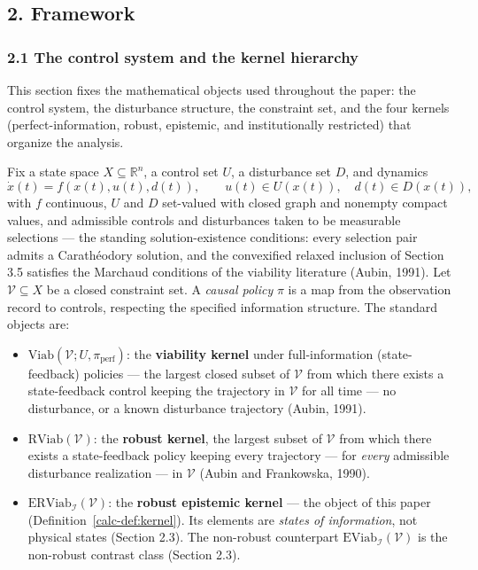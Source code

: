\documentclass[10pt,twocolumn]{article}
\theoremstyle{definition}
\providecommand{\tightlist}{\setlength{\itemsep}{0pt}\setlength{\parskip}{0pt}}
\begin{document}
\subsection{2. Framework}\label{calc-framework}

\subsubsection{2.1 The control system and the kernel
hierarchy}\label{calc-the-control-system-and-the-kernel-hierarchy}

This section fixes the mathematical objects used throughout the paper:
the control system, the disturbance structure, the constraint set, and
the four kernels (perfect-information, robust, epistemic, and
institutionally restricted) that organize the analysis.

Fix a state space \(X \subseteq \mathbb{R}^n\), a control set \(U\), a
disturbance set \(D\), and dynamics
\[\dot x(t) = f(x(t), u(t), d(t)), \qquad u(t) \in U(x(t)), \quad d(t) \in D(x(t)),\]
with \(f\) continuous, \(U\) and \(D\) set-valued with closed graph and
nonempty compact values, and admissible controls and disturbances taken
to be measurable selections --- the standing solution-existence conditions:
every selection pair admits a Carath\'eodory solution, and the
convexified relaxed inclusion of Section 3.5 satisfies the Marchaud
conditions of the viability literature (Aubin, 1991). Let \(\mathcal{V} \subseteq X\) be a closed
constraint set. A \emph{causal policy} \(\pi\) is a map from the
observation record to controls, respecting the specified information structure. The standard objects are:

\begin{itemize}
\tightlist
\item
  \(\mathrm{Viab}(\mathcal{V}; U, \pi_{\mathrm{perf}})\): the
  \textbf{viability kernel} under full-information (state-feedback)
  policies --- the largest closed subset of \(\mathcal{V}\) from which
  there exists a state-feedback control keeping the trajectory in
  \(\mathcal{V}\) for all time --- no disturbance, or a known
  disturbance trajectory (Aubin, 1991).
\item
  \(\mathrm{RViab}(\mathcal{V})\): the \textbf{robust kernel}, the
  largest subset of \(\mathcal{V}\) from which there exists a
  state-feedback policy keeping every trajectory --- for \emph{every}
  admissible disturbance realization --- in \(\mathcal{V}\) (Aubin and
  Frankowska, 1990).
\item
  \(\mathrm{ERViab}_{\mathcal{I}}(\mathcal{V})\): the \textbf{robust
  epistemic kernel} --- the object of this paper (Definition~\ref{calc-def:kernel}). Its
  elements are \emph{states of information}, not physical states
  (Section 2.3). The non-robust counterpart
  \(\mathrm{EViab}_{\mathcal{I}}(\mathcal{V})\) is the non-robust contrast class (Section 2.3).
\end{itemize}
\end{document}
